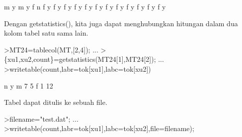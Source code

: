 \documentclass[a4paper,10pt]{article}
\begin{document}
\begin{eulernotebook}
\begin{eulercomment}
\begin{eulercomment}
\begin{eulercomment}
\begin{eulercomment}
\begin{eulercomment}
\begin{eulercomment}
\begin{eulercomment}
\begin{eulercomment}
\begin{eulercomment}
\begin{eulercomment}
\begin{eulercomment}
\begin{eulercomment}
\begin{eulercomment}
\begin{eulercomment}
\begin{eulercomment}
\begin{eulercomment}
\begin{eulercomment}
\begin{eulercomment}
\begin{eulercomment}
\begin{eulercomment}
\begin{eulercomment}
\begin{eulercomment}
\begin{eulercomment}
\begin{eulercomment}
\begin{eulercomment}
\begin{eulercomment}
\begin{eulercomment}
\begin{eulercomment}
\begin{eulercomment}
\begin{eulercomment}
\begin{eulercomment}
\begin{eulercomment}
\begin{eulercomment}
\begin{eulercomment}
\begin{eulercomment}
\begin{eulercomment}
\begin{eulercomment}
\begin{eulercomment}
\begin{eulercomment}
\begin{eulercomment}
\begin{eulercomment}
\begin{eulercomment}
\begin{eulercomment}
\begin{eulercomment}
\begin{euleroutput}
           m         y
           m         y
           f         n
           f         y
           f         y
           f         y
           f         y
           f         y
           f         y
           f         y
           f         y
           f         y
           f         y
           f         y
           f         y
\end{euleroutput}
\begin{eulercomment}
Dengan getstatistics(), kita juga dapat menghubungkan hitungan dalam
dua kolom tabel satu sama lain.
\end{eulercomment}
\begin{eulerprompt}
>MT24=tablecol(MT,[2,4]); ...
>\{xu1,xu2,count\}=getstatistics(MT24[1],MT24[2]); ...
>writetable(count,labr=tok[xu1],labc=tok[xu2])
\end{eulerprompt}
\begin{euleroutput}
                     n         y
           m         7         5
           f         1        12
\end{euleroutput}
\begin{eulercomment}
Tabel dapat ditulis ke sebuah file.
\end{eulercomment}
\begin{eulerprompt}
>filename="test.dat"; ...
>writetable(count,labr=tok[xu1],labc=tok[xu2],file=filename);
\end{eulerprompt}
\begin{eulercomment}

\end{eulercomment}
\end{eulercomment}
\end{eulercomment}
\end{eulercomment}
\end{eulercomment}
\end{eulercomment}
\end{eulercomment}
\end{eulercomment}
\end{eulercomment}
\end{eulercomment}
\end{eulercomment}
\end{eulercomment}
\end{eulercomment}
\end{eulercomment}
\end{eulercomment}
\end{eulercomment}
\end{eulercomment}
\end{eulercomment}
\end{eulercomment}
\end{eulercomment}
\end{eulercomment}
\end{eulercomment}
\end{eulercomment}
\end{eulercomment}
\end{eulercomment}
\end{eulercomment}
\end{eulercomment}
\end{eulercomment}
\end{eulercomment}
\end{eulercomment}
\end{eulercomment}
\end{eulercomment}
\end{eulercomment}
\end{eulercomment}
\end{eulercomment}
\end{eulercomment}
\end{eulercomment}
\end{eulercomment}
\end{eulercomment}
\end{eulercomment}
\end{eulercomment}
\end{eulercomment}
\end{eulercomment}
\end{eulercomment}
\end{eulercomment}
\end{eulernotebook}
\end{document}
